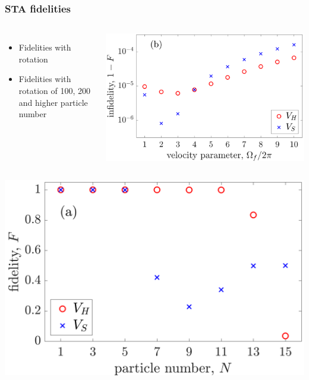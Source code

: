 \documentclass{beamer}
\begin{document}
\begin{frame}
\frametitle{STA fidelities}
\begin{columns}

\begin{itemize}
\item Fidelities with rotation
\item Fidelities with rotation of 100, 200 and higher particle number
\end{itemize}
\includegraphics[width=\textwidth]{../data/1d/fig6.png}

\end{columns}

\begin{columns}
\includegraphics[width=\textwidth]{../data/1d/fig7a.png}


\end{columns}
\end{frame}
\end{document}
